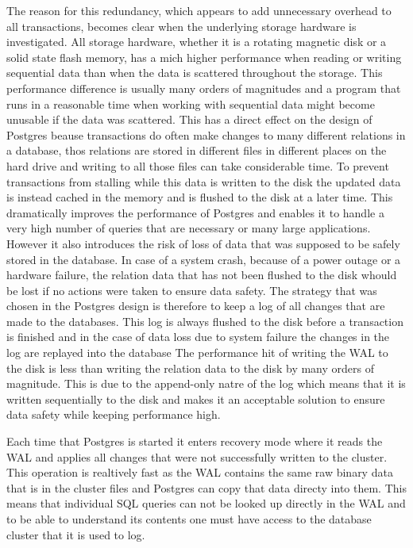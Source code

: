\documentclass[a4paper,12pt,twoside,BCOR=10mm]{scrbook}
\begin{document}
The reason for this redundancy, which appears to add unnecessary overhead to all transactions, becomes clear when the underlying storage hardware is investigated. All storage hardware, whether it is a rotating magnetic disk or a solid state flash memory, has a mich higher performance when reading or writing sequential data than when the data is scattered throughout the storage. This performance difference is usually many orders of magnitudes and a program that runs in a reasonable time when working with sequential data might become unusable if the data was scattered. This has a direct effect on the design of Postgres beause transactions do often make changes to many different relations in a database, thos relations are stored in different files in different places on the hard drive and writing to all those files can take considerable time. To prevent transactions from stalling while this data is written to the disk the updated data is instead cached in the memory and is flushed to the disk at a later time. 
This dramatically improves the performance of Postgres and enables it to handle a very high number of queries that are necessary or many large applications. However it also introduces the risk of loss of data that was supposed to be safely stored in the database. In case of a system crash, because of a power outage or a hardware failure, the relation data that has not been flushed to the disk whould be lost if no actions were taken to ensure data safety. The strategy that was chosen in the Postgres design is therefore to keep a log of all changes that are made to the databases. This log is always flushed to the disk before a transaction is finished and in the case of data loss due to system failure the changes in the log are replayed into the database The performance hit of writing the WAL to the disk is less than writing the relation data to the disk by many orders of magnitude. This is due to the append-only natre of the log which means that it is written sequentially to the disk and makes it an acceptable 
solution to ensure data safety while keeping performance high.


Each time that Postgres is started it enters recovery mode where it reads the WAL and applies all changes that were not successfully written to the cluster. This operation is realtively fast as the WAL contains the same raw binary data that is in the cluster files and Postgres can copy that data directy into them. This means that individual SQL queries can not be looked up directly in the WAL and to be able to understand its contents one must have access to the database cluster that it is used to log.
\end{document}
